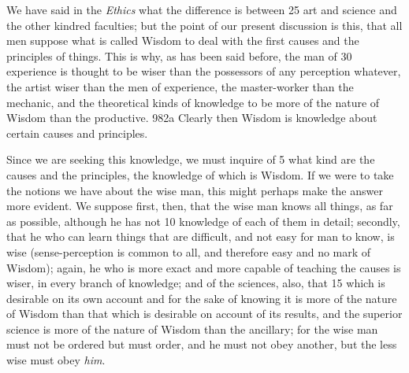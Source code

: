We have said in the \emph{Ethics} what the difference is between 25 art and science and the other kindred faculties; but the point of our present discussion is this, that all men suppose what is called Wisdom to deal with the first causes and the principles of things. This is why, as has been said before, the man of 30 experience is thought to be wiser than the possessors of any perception whatever, the artist wiser than the men of experience, the master-worker than the mechanic, and the theoretical kinds of knowledge to be more of the nature of Wisdom than the productive. 982a Clearly then Wisdom is knowledge about certain causes and principles.


Since we are seeking this knowledge, we must inquire of 5 what kind are the causes and the principles, the knowledge of which is Wisdom. If we were to take the notions we have about the wise man, this might perhaps make the answer more evident. We suppose first, then, that the wise man knows all things, as far as possible, although he has not 10 knowledge of each of them in detail; secondly, that he who can learn things that are difficult, and not easy for man to know, is wise (sense-perception is common to all, and therefore easy and no mark of Wisdom); again, he who is more exact and more capable of teaching the causes is wiser, in every branch of knowledge; and of the sciences, also, that 15 which is desirable on its own account and for the sake of knowing it is more of the nature of Wisdom than that which is desirable on account of its results, and the superior science is more of the nature of Wisdom than the ancillary; for the wise man must not be ordered but must order, and he must not obey another, but the less wise must obey \emph{him}.

